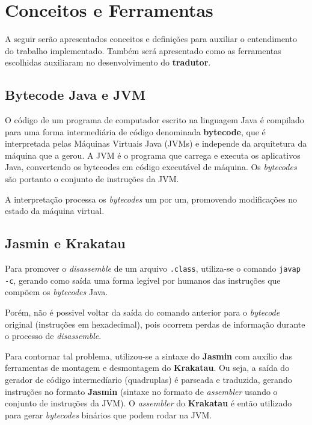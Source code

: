 \section{Conceitos e Ferramentas}

A seguir serão apresentados conceitos e definições para auxiliar o entendimento do trabalho implementado. Também será apresentado como as ferramentas escolhidas auxiliaram no desenvolvimento do \textbf{tradutor}.

\subsection{Bytecode Java e JVM}

O código de um programa de computador escrito na linguagem Java é compilado para uma forma intermediária de código denominada \textbf{bytecode}, que é interpretada pelas Máquinas Virtuais Java (JVMs) e independe da arquitetura da máquina que a gerou. A JVM é o programa que carrega e executa os aplicativos Java, convertendo os bytecodes em código executável de máquina. Os \textit{bytecodes} são portanto o conjunto de instruções da JVM.

A interpretação processa os \textit{bytecodes} um por um, promovendo modificações no estado da máquina virtual.

\subsection{Jasmin e Krakatau}

Para promover o \textit{disassemble} de um arquivo \texttt{.class}, utiliza-se o comando \texttt{javap -c}, gerando como saída uma forma legível por humanos das instruções que compõem os \textit{bytecodes} Java.

Porém, não é possivel voltar da saída do comando anterior para o \textit{bytecode} original (instruções em hexadecimal), pois ocorrem perdas de informação durante o processo de \textit{disassemble}.

Para contornar tal problema, utilizou-se a sintaxe do \textbf{Jasmin} com auxílio das ferramentas de montagem e desmontagem do \textbf{Krakatau}. Ou seja, a saída do gerador de código intermedíario (quadruplas) é parseada e traduzida, gerando instruções no formato \textbf{Jasmin} (sintaxe no formato de \textit{assembler} usando o conjunto de instruções da JVM). O \textit{assembler} do \textbf{Krakatau} é então utilizado para gerar \textit{bytecodes} binários que podem rodar na JVM.


